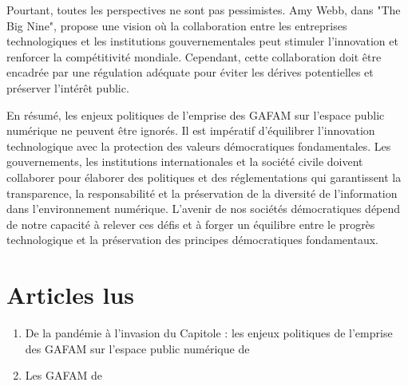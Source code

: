 \documentclass[12pt,a4paper]{article} %
\begin{document}
    Pourtant, toutes les perspectives ne sont pas pessimistes. Amy Webb, dans "The Big Nine", propose une vision où la collaboration entre les entreprises technologiques et les institutions gouvernementales peut stimuler l'innovation et renforcer la compétitivité mondiale. Cependant, cette collaboration doit être encadrée par une régulation adéquate pour éviter les dérives potentielles et préserver l'intérêt public. 
    
    En résumé, les enjeux politiques de l'emprise des GAFAM sur l'espace public numérique ne peuvent être ignorés. Il est impératif d'équilibrer l'innovation technologique avec la protection des valeurs démocratiques fondamentales. Les gouvernements, les institutions internationales et la société civile doivent collaborer pour élaborer des politiques et des réglementations qui garantissent la transparence, la responsabilité et la préservation de la diversité de l'information dans l'environnement numérique. L'avenir de nos sociétés démocratiques dépend de notre capacité à relever ces défis et à forger un équilibre entre le progrès technologique et la préservation des principes démocratiques fondamentaux.
    
    	\section{Articles lus}
    \begin{enumerate}
    	\item De la pandémie à l’invasion du Capitole : les enjeux politiques de l’emprise des GAFAM sur l’espace public numérique de \cite{Smyrnaios2021}
    	\item Les GAFAM de \cite{SushchevaNatalia2018}
    \end{enumerate}
    
    
    
	\printbibliography
\end{document}
